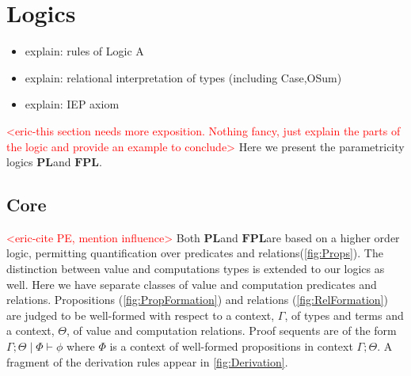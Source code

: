 \documentclass[acmsmall]{acmart}
\newcommand{\eric}[1]{\textcolor{red}{ <eric-#1> }}
\newcommand{\pl}{$\mathbf{PL}$}
\newcommand{\fpl}{$\mathbf{FPL}$}
\begin{document}
\section{Logics}\label{sec:Logics}
\begin{itemize}
  \item explain: rules of Logic A
  \item explain: relational interpretation of types (including Case,OSum)
  \item explain: IEP axiom
\end{itemize}
\eric{this section needs more exposition. Nothing fancy, just explain the parts of the logic and provide an example to conclude}
Here we present the parametricity logics \pl\;and \fpl.

\subsection{Core}
\eric{cite PE, mention influence}
Both \pl\;and \fpl\;are based on a higher order logic, permitting quantification over predicates and relations(\cref{fig:Props}). The distinction between value and computations types is extended to our logics as well. Here we have separate classes of value and computation predicates and relations. Propositions (\cref{fig:PropFormation}) and relations (\cref{fig:RelFormation}) are judged to be well-formed with respect to a context, $\Gamma$, of types and terms and a context, $\Theta$, of value and computation relations.  Proof sequents are of the form $\Gamma ; \Theta \;|\; \Phi \vdash \phi$ where $\Phi$ is a context of well-formed propositions in context $\Gamma; \Theta$. A fragment of the derivation rules appear in \cref{fig:Derivation}. 
\end{document}
